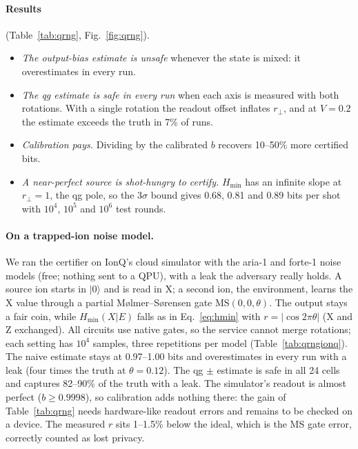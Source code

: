 \documentclass[11pt]{article}
\begin{document}
\paragraph{Results} (Table~\ref{tab:qrng}, Fig.~\ref{fig:qrng}).
\begin{itemize}
\item \emph{The output-bias estimate is unsafe} whenever the state is mixed: it overestimates in
every run.
\item \emph{The qg estimate is safe in every run} when each axis is measured with both rotations.
With a single rotation the readout offset inflates $r_\perp$, and at $V=0.2$ the estimate exceeds the
truth in 7\% of runs.
\item \emph{Calibration pays.} Dividing by the calibrated $b$ recovers 10--50\% more certified bits.
\item \emph{A near-perfect source is shot-hungry to certify.} $H_{\min}$ has an infinite slope at
$r_\perp=1$, the qg pole, so the $3\sigma$ bound gives 0.68, 0.81 and 0.89 bits per shot with
$10^4$, $10^5$ and $10^6$ test rounds.
\end{itemize}

\paragraph{On a trapped-ion noise model.} We ran the certifier on IonQ's cloud simulator with the
aria-1 and forte-1 noise models (free; nothing sent to a QPU), with a leak the adversary really holds.
A source ion starts in $|0\rangle$ and is read in X; a second ion, the environment, learns the X
value through a partial M{\o}lmer--S{\o}rensen gate $\mathrm{MS}(0,0,\theta)$. The output stays a fair
coin, while $H_{\min}(X|E)$ falls as in Eq.~\eqref{eq:hmin} with $r=|\cos2\pi\theta|$ (X and Z
exchanged). All circuits use native gates, so the service cannot merge rotations; each setting has
$10^4$ samples, three repetitions per model (Table~\ref{tab:qrngionq}). The naive estimate stays at
0.97--1.00 bits and overestimates in every run with a leak (four times the truth at $\theta=0.12$).
The qg $\pm$ estimate is safe in all 24 cells and captures 82--90\% of the truth with a leak. The
simulator's readout is almost perfect ($b\ge0.9998$), so calibration adds nothing there: the gain of
Table~\ref{tab:qrng} needs hardware-like readout errors and remains to be checked on a device. The
measured $r$ sits 1--1.5\% below the ideal, which is the MS gate error, correctly counted as lost
privacy.
\end{document}
